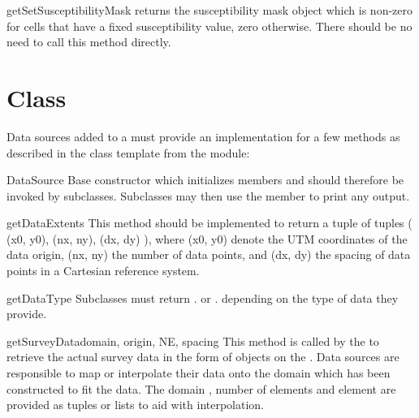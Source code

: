\begin{methoddesc}[DomainBuilder]{getSetSusceptibilityMask}{}
returns the susceptibility mask \Data object which is non-zero for cells that
have a fixed susceptibility value, zero otherwise.
There should be no need to call this method directly.
\end{methoddesc}

\section{ Class}\label{sec:ref:DataSource}

Data sources added to a  must provide an implementation for
a few methods as described in the class template  from
the  module:

\begin{classdesc}{DataSource}{}
Base constructor which initializes members and should therefore be invoked by
subclasses. Subclasses may then use the member  to print any
output.
\end{classdesc}

\begin{methoddesc}[DataSource]{getDataExtents}{}
This method should be implemented to return a tuple of tuples
( (x0, y0), (nx, ny), (dx, dy) ), where (x0, y0) denote the UTM coordinates of
the data origin, (nx, ny) the number of data points, and (dx, dy) the spacing
of data points in a Cartesian reference system.
\end{methoddesc}

\begin{methoddesc}[DataSource]{getDataType}{}
Subclasses must return . or
. depending on the type of data they provide.
\end{methoddesc}

\begin{methoddesc}[DataSource]{getSurveyData}{domain, origin, NE, spacing}
This method is called by the  to retrieve the actual survey
data in the form of \Data objects on the .
Data sources are responsible to map or interpolate their data onto the domain
which has been constructed to fit the data.
The domain , number of elements  and element
 are provided as tuples or lists to aid with interpolation.
\end{methoddesc}

